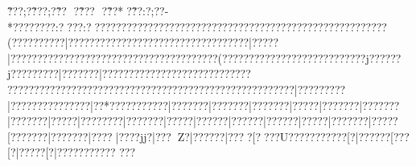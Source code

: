 {{{{{{{{{{{{{{{{{{{{{{{{{{{{{{{{{{{{{{{{{{{{{{{{{{{{{{{{{{{{{{{{{{{{{{{{{{{{{{{{{{{{{{{{{{{{{{{{{{{{{{{{{{{{{{{{{{{{{{{{{{{{{{{{{{{{{{{{{{{{{{{{{{{{{{{{{{{{{{{{{{{{{{{{{{{{{{{{{{{{{{{{{{{{{{{{{{{{{{{{{{{{{{{{{{{{{{{{{{{{{{{{{{{{{{{{{{{{{{{{{{{{{{{{{{{{{{{{{{{{{{{{{{{{{{{{{{{{{{{{{{{{{{{{{{{{{{{{{{{{{{{{{{{{{{{{{{{{{{{{{{{{{{{{{{{{{{{{{{{{{{{{{{{{{{{{{{{{{{{{{{{{{{{{{{{{{{{{{{{{{{{{{{{{{{{{{{{{{{{{{{{{{{{{{{{{{{{{{{{{{{{{{{{{{{{{{{{{{{{{{{{{{{{{{{{{{{{{{{{{{{{{{{{{{{{{{{{{{{{{{{{{{{{{{{{{{{{{{{{{{{{{{{{{{{{{{{{{{{{{{{{{{{{{{{{{{{{{{{{{{{{{{{{{{{{{{{{{{{{{{{{{{{{{{{{{{{{{{{{{{{{{{{{{{{{{{{{{{{{{{{{{{{{{{{{{{{{{{{{{{{{{{{{{{{{{{{{{{{{{{{{{{{{{{{{{{{{{{{{{{{{{{{{{{{{{{{{{{{{{{{{{{{{{{{{{{{{{{{{{{{{{{{{{{{{{{{{{{{{{{{{{{{{{{{{{{{{{{{{{{{{{{{{{{{{{{{{{{{{{{{{{{{{{{{{{{{{{{{{{{{{{{{{{{{{{{{{{{{{{{{{{{{{{{{{{{{{{{{{{{{{{{{{{{{{{{{{{{{{{{{{{{{{{{{{{{{{{{{{{{{{{{{{{{{{{{{{{{{{{{{{{{{{{{{{{{{{{{{{{{{{{{{{{{{{{{{{{{{{{{{{{{{{{{{{{{{{{{{{{{{{{{{{{{{{{{{{{{{{{{{{{{{{{{{{{{{{{{{{{{{{{{{{{{{{{{{{{{{{{{{{{{{{{{{{{{{{{{{{{{{{{{{{{{{{{{{{{{{{{{{{{{{{{{{{{{{{{{{{{{{{{{{{{{{{{{{{{{{{{{{{{{{{{{{{{{{{{{{{{{{{{{{{{{{{{{{{{{{{{{{{{{{{{{{{{{{{{{{{{{{{{{{{{{{{{{{{{{{{{{{{{{{{{{{{{{{{{{{{{{{{{{{{{{{{{{{{{{{{{{{{{{{{{{{{{{{{{{{{{{{{{{{{{{{{{{{{{{{{{{{{{{{{{{{{{{{{{{{{{{{{{{{{{{{{{{{{{{{{{{{{{{{{{{{{{{{{{{{{{{{{{{{{{{{{{{{{{{{{{{{{{{{{{{{{{{{{{{{{{{{{{{{{{{{{{{{{{{{{{{{{{{{{{{{{{{{{{{{{{{{{{{{{{{{{{{{{{{{{{{{{{{{{{{{{{{{{{{{{{{{{{{{{{{{{{{{{{{{{{{{{{{{{{{{{{{{{{{{{{{{{{{{{{{{{{{{{{{{{{{{{{{{{{{{{{{{{{{{{{{{{{{{{{{{{{{{{{{{{{{{{{{{{{{{{{{{{{{{{{{{{{{{{{{{{{{{{{{{{{{{{{{{{{{{{{{{{{{{{{{{{{{{{{{{{{{{{{{{{{{{{{{{{{{{{{{{{{{{{{{{{{{{{{{{{{{{{{{{{{{{{{{{{{{{{{{{{{{{{{{{{{{{{{{{{{{{{{{{{{{{{{{{{{{{{{{{{{{{{{{{{{{{{{{{{{{{{{{{{{{{{{{{{{{{{{{{{{{{{{{{{{{{{{{{{{{{{{{{{{{{{{{{{{{{{{{{{{{{{{{{{{{{{{{{{{{{{{{{{{{{{{{{{{{{{{{{{{{{{{{{{{{{{{{{{{{{{{{{{{{{{{{{{{{{{{{{{{{{{{{{{{{{{{{{{{{{{{{{{{{{{{{{{{{{{{{{{{{{{{{{{{{{{{{{{{{{{{{{{{{{{{{{{{{{{{{{{{{{{{{{{{{{{{{{{{{{{{{{{{{{{{{{{{{{{{{{{{{{{{{{{{{{{{{{{{{{{{{{{{{{{{{{{{{{{{{{{{{{{{{{{{{{{{{{{{{{{{{{{{{{{{{{{{{{{{{{{{{{{{{{{{{{{{{{{{{{{{{{{{{{{{{{{{{{{{{{{{{{{{{{{{{{{{{{{{{{{{{{{{{{{{{{{{{{{{{{{{{{{{{{{{{{{{{{{{{{{{{{{{{{{{{{{{{{{{{{{{{{{{{{{{{\~??? ;?\~??? ;?\~??
 ?\~???
?\~??* ?\~??  :?;??-*?{???????:??  ??:?? ??????????????????????????????????????????????????????(??????????|???{?????????????????{???????{???????|?????|???????????????????????????????????????(???????????????????????????j??????j?????????|???????|???????????????????????????? ???????????????????????????????????????????????{???????|?????????|???????????????|??*???????????|???????|???????|???????|?????|???????|???????|???????|?????|?{???????|???????|?????|?{?????|?{?????|?{?????|?{????|?{??????|?????[???????|?{?????{?|????|?{???jj{?|???Z?|?????{?|??? {?[??  {?{?U???{?\???? {?\????[?|?????{?[?  ??[?|?????[?|?????{?\?????{?\?
???\?{?????{?\?????{?[?????{?\?????[?|???{?\?????{?\?????{?\?????|?[?????[?[???/?;?[?U???;?[?}???:?|?????:?|????[?|???( :?[?UU??:?|?????:?[?UU?;?[?UU_?[?\?????[?;??? /;?[?? ?;?{?????;?\?????[?;?????;?[?????;?[????*;?[?????;?;??????\??????;?UU???;?????;????_?;?U^~?;?<~?  ;?<~?(  ;?|~?*  ?\~?????<~?????\~????;?\~??? ;?\~??? ;?\~????\?;~????;~<????*\?;~????;~\?????;?[~
*/?[??????[?;?????[?;?????\?;????_;?\~??? ;?\~??? ;?\~????\?;~?????\~????<~;~???]<~;~_??U\~;~????[~~???}}}}}}}}}}}}}}}}}}}}}}}}}}}}}}}}}}}}}}}}}}}}}}}}}}}}}}}}}}}}}}}}}}}}}}}}}}}}}}}}}}}}}}}}}}}}}}}}}}}}}}}}}}}}}}}}}}}}}}}}}}}}}}}}}}}}}}}}}}}}}}}}}}}}}}}}}}}}}}}}}}}}}}}}}}}}}}}}}}}}}}}}}}}}}}}}}}}}}}}}}}}}}}}}}}}}}}}}}}}}}}}}}}}}}}}}}}}}}}}}}}}}}}}}}}}}}}}}}}}}}}}}}}}}}}}}}}}}}}}}}}}}}}}}}}}}}}}}}}}}}}}}}}}}}}}}}}}}}}}}}}}}}}}}}}}}}}}}}}}}}}}}}}}}}}}}}}}}}}}}}}}}}}}}}}}}}}}}}}}}}}}}}}}}}}}}}}}}}}}}}}}}}}}}}}}}}}}}}}}}}}}}}}}}}}}}}}}}}}}}}}}}}}}}}}}}}}}}}}}}}}}}}}}}}}}}}}}}}}}}}}}}}}}}}}}}}}}}}}}}}}}}}}}}}}}}}}}}}}}}}}}}}}}}}}}}}}}}}}}}}}}}}}}}}}}}}}}}}}}}}}}}}}}}}}}}}}}}}}}}}}}}}}}}}}}}}}}}}}}}}}}}}}}}}}}}}}}}}}}}}}}}}}}}}}}}}}}}}}}}}}}}}}}}}}}}}}}}}}}}}}}}}}}}}}}}}}}}}}}}}}}}}}}}}}}}}}}}}}}}}}}}}}}}}}}}}}}}}}}}}}}}}}}}}}}}}}}}}}}}}}}}}}}}}}}}}}}}}}}}}}}}}}}}}}}}}}}}}}}}}}}}}}}}}}}}}}}}}}}}}}}}}}}}}}}}}}}}}}}}}}}}}}}}}}}}}}}}}}}}}}}}}}}}}}}}}}}}}}}}}}}}}}}}}}}}}}}}}}}}}}}}}}}}}}}}}}}}}}}}}}}}}}}}}}}}}}}}}}}}}}}}}}}}}}}}}}}}}}}}}}}}}}}}}}}}}}}}}}}}}}}}}}}}}}}}}}}}}}}}}}}}}}}}}}}}}}}}}}}}}}}}}}}}}}}}}}}}}}}}}}}}}}}}}}}}}}}}}}}}}}}}}}}}}}}}}}}}}}}}}}}}}}}}}}}}}}}}}}}}}}}}}}}}}}}}}}}}}}}}}}}}}}}}}}}}}}}}}}}}}}}}}}}}}}}}}}}}}}}}}}}}}}}}}}}}}}}}}}}}}}}}}}}}}}}}}}}}}}}}}}}}}}}}}}}}}}}}}}}}}}}}}}}}}}}}}}}}}}}}}}}}}}}}}}}}}}}}}}}}}}}}}}}}}}}}}}}}}}}}}}}}}}}}}}}}}}}}}}}}}}}}}}}}}}}}}}}}}}}}}}}}}}}}}}}}}}}}}}}}}}}}}}}}}}}}}}}}}}}}}}}}}}}}}}}}}}}}}}}}}}}}}}}}}}}}}}}}}}}}}}}}}}}}}}}}}}}}}}}}}}}}}}}}}}}}}}}}}}}}}}}}}}}}}}}}}}}}}}}}}}}}}}}}}}}}}}}}}}}}}}}}}}}}}}}}}}}}}}}}}}}}}}}}}}}}}}}}}}}}}}}}}}}}}}}}}}}}}}}}}}}}}}}}}}}}}}}}}}}}}}}}}}}}}}}}}}}}}}}}}}}}}}}}}}}}}}}}}}}}}}}}}}}}}}}}}}}}}}}}}}}}}}}}}}}}}}}}}}}}}}}}}}}}}}}}}}}}}}}}}}}}}}}}}}}}}}}}}}}}}}}}}}}}}}}}}}}}}}}}}}}}}}}}}}}}}}}}}}}}}}}}}}}}}}}}}}}}}}}}}}}}}}}}}}}}}}}}}}}}}}}}}}}}}}}}}}}}}}}}}}}}}}}}}}}}}}}}}}}}}}}}}}}}}}}}}}}}}}}}}}}}}}}}}}}}}}}}}}}}}}}}}}}}}}}}}}}}}}}}}}}}}}}}}}}}}}}}}}}}}}}}}}}}}}}}}}}}}}}}}}}}}}}}}}}}}}}}}}}}}}}}}}}}}}}}}}}}}}}}}}}}}}}}}}}}}}}}}}}}}}}}}}}}}}}}}}}}}}}}}}}}}}}}}}}}}}}}}}}}}}}}}}}}}}}}}}}}}}}}}}}}}}}}}}}}}}}}}}}}}}}}}}}}}}}}}}}}}}}}}}}}}}}}}}}}}}}}}}}}}}}}}}}}}}}}}}}}}}}}}}}}}}}}}}}}}}}}}}}}}}}}}}}}}}}}}}}}}}}}}}}}}}}}}}}}}}}}}}}}}}}}}}}}}}}}}}}}}}}}}}}}}}}}}}}}}}}}}}}}}}}}}}}}}}}}}}}}}}}}}}}}}}}}}}}}}}}}

